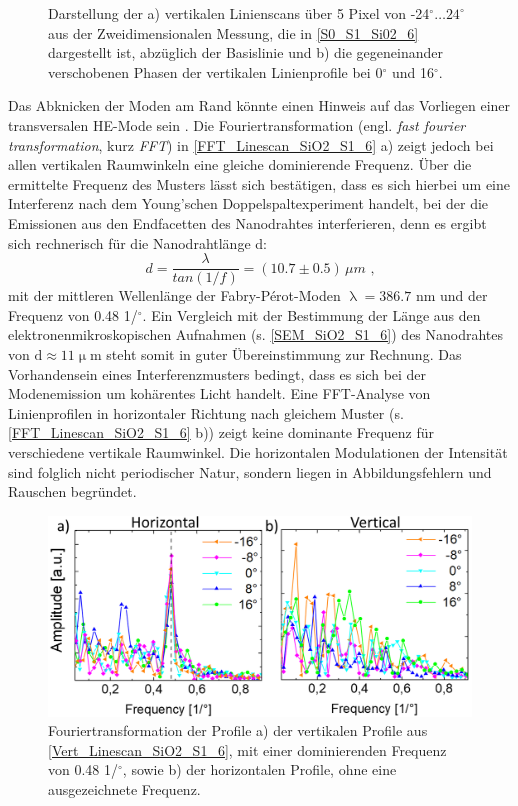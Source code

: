 \begin{figure}[b]
\caption{Darstellung der a) vertikalen Linienscans über 5 Pixel von -24$^\circ \ldots \text{24}^\circ$ aus der Zweidimensionalen Messung, die in \autoref{S0_S1_Si02_6} dargestellt ist, abzüglich der Basislinie und b) die gegeneinander verschobenen Phasen der vertikalen Linienprofile bei 0$^\circ$ und 16$^\circ$.}
\label{Vert_Linescan_SiO2_S1_6}
\end{figure} Das Abknicken der Moden am Rand könnte einen Hinweis auf das Vorliegen einer transversalen HE-Mode sein \cite{Saxena.2015}. Die Fouriertransformation (engl. \textit{fast fourier transformation}, kurz \textit{FFT}) in \autoref{FFT_Linescan_SiO2_S1_6} a) zeigt jedoch bei allen vertikalen Raumwinkeln eine gleiche dominierende Frequenz. Über die ermittelte Frequenz des Musters lässt sich bestätigen, dass es sich hierbei um eine Interferenz nach dem Young'schen Doppelspaltexperiment handelt, bei der die Emissionen aus den Endfacetten des Nanodrahtes interferieren, denn es ergibt sich rechnerisch für die Nanodrahtlänge d:
\begin{equation}
d=\frac{\lambda}{tan(1/f)}=(10.7 \pm 0.5) \, \mu m \text{ ,}
\label{Distance}
\end{equation}
mit der mittleren Wellenlänge der Fabry-Pérot-Moden $\uplambda= \text{386.7}$ nm und der Frequenz von 0.48 1/$^\circ$. Ein Vergleich mit der Bestimmung der Länge aus den elektronenmikroskopischen Aufnahmen (s. \autoref{SEM_SiO2_S1_6}) des Nanodrahtes von $\text{d}\approx \text{11}\upmu \text{m}$ steht somit in guter Übereinstimmung zur Rechnung. Das Vorhandensein eines Interferenzmusters bedingt, dass es sich bei der Modenemission um kohärentes Licht handelt. Eine FFT-Analyse von Linienprofilen in horizontaler Richtung nach gleichem Muster (s. \autoref{FFT_Linescan_SiO2_S1_6} b)) zeigt keine dominante Frequenz für verschiedene vertikale Raumwinkel. Die horizontalen Modulationen der Intensität sind folglich nicht periodischer Natur, sondern liegen in Abbildungsfehlern und Rauschen begründet.
\begin{figure}[t]
\includegraphics[width=.66\textwidth]{Bilder/SiO2/FFT_Linescan_SiO2_S1_6}
\caption{Fouriertransformation der Profile a) der vertikalen Profile aus \autoref{Vert_Linescan_SiO2_S1_6}, mit einer dominierenden Frequenz von 0.48  1/$^\circ$, sowie b) der horizontalen Profile, ohne eine ausgezeichnete Frequenz.}
\label{FFT_Linescan_SiO2_S1_6}
\end{figure}
